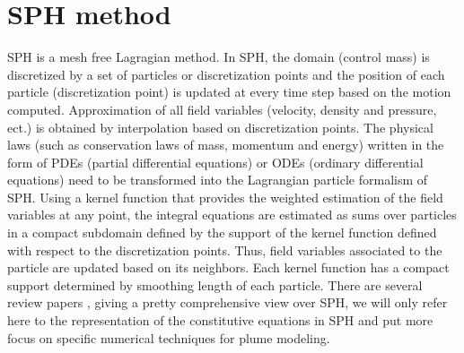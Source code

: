 \documentclass[journal abbreviation, manuscript]{copernicus}
\begin{document}
\section{SPH method} \label{sec:SPH_method}
SPH is a mesh free Lagragian method. In SPH, the domain (control mass) is discretized by a set of particles or discretization points and the position of each particle (discretization point) is updated at every time step based on the motion computed. Approximation of all field variables (velocity, density and pressure, ect.) is obtained by interpolation based on discretization points. The physical laws (such as conservation laws of mass, momentum and energy) written in the form of PDEs (partial differential equations)  or ODEs (ordinary differential equations) need to be transformed into the Lagrangian particle formalism of SPH. Using a kernel function that provides the weighted estimation of the field variables at any point, the integral equations are estimated as sums over particles in a compact subdomain defined by the support of the kernel function defined with respect to the discretization points. Thus, field variables associated to the particle are updated based on its neighbors. Each kernel function has a compact support determined by smoothing length of each particle. There are several review papers \citep{monaghan1992smoothed, monaghan2005smoothed, rosswog2009astrophysical, price2012smoothed, monaghan2012smoothed}, giving a pretty comprehensive view over SPH, we will only refer here to the representation of the constitutive equations in SPH and put more focus on specific numerical techniques for plume modeling.
\end{document}
